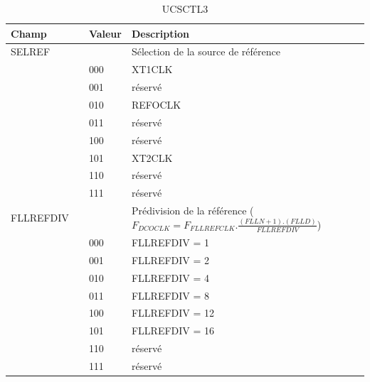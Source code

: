 \begin{table}[H]
\centering 
\begin{tabular}{l l l l}
\hline\hline
Champ & & Valeur & Description \\ %
\hline
SELREF & & & Sélection de la source de référence  \\
& & 000 & XT1CLK \\
& & 001 & réservé \\
& & 010 & REFOCLK \\
& & 011 & réservé \\
& & 100 & réservé \\
& & 101 & XT2CLK \\
& & 110 & réservé \\
& & 111 & réservé \\
\hline
FLLREFDIV & & & Prédivision de la référence ($F_{DCOCLK}=F_{FLLREFCLK}.\frac{(FLLN+1).(FLLD)}{FLLREFDIV}$) \\
& & 000 & FLLREFDIV = 1 \\
& & 001 & FLLREFDIV = 2 \\
& & 010 & FLLREFDIV = 4 \\
& & 011 & FLLREFDIV = 8 \\
& & 100 & FLLREFDIV = 12 \\
& & 101 & FLLREFDIV = 16 \\
& & 110 & réservé \\
& & 111 & réservé \\
\hline
\end{tabular}
\caption{UCSCTL3}
\label{table:UCSCTL3}
\end{table}

